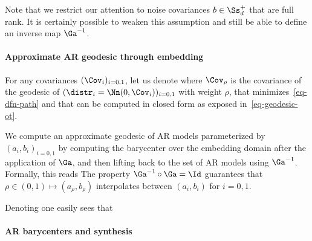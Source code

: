 Note that we restrict our attention to noise covariances $b \in \Ss_d^+$ that are full rank. It is certainly possible to weaken this assumption and still be able to define an inverse map $\Ga^{-1}$.

\paragraph{Approximate AR geodesic through embedding}


For any covariances $(\Cov_i)_{i=0,1}$, let us denote
where $\Cov_\rho$ is the covariance of the geodesic of $(\distr_i=\Nn(0,\Cov_i))_{i=0,1}$ with weight $\rho$, that minimizes~\eqref{eq-dfn-path} and that can be computed in closed form as exposed in~\eqref{eq-geodesic-ot}. 

We compute an approximate geodesic of AR models parameterized by $(a_i,b_i)_{i=0,1}$ by computing the barycenter over the embedding domain after the application of $\Ga$, and then lifting back to the set of AR models using $\Ga^{-1}$. Formally, this reads
The property $\Ga^{-1} \circ \Ga = \Id$ guarantees that $\rho \in (0,1) \mapsto (a_\rho,b_\rho)$ interpolates between $(a_i,b_i)$ for $i=0,1$.

Denoting
one easily sees that 





\paragraph{AR barycenters and synthesis} 

